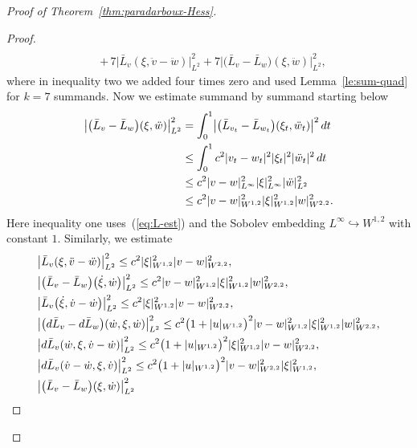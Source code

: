 \documentclass[10pt,a4paper]{amsart}
\def\abs#1{\mathopen|#1\mathclose|}
\newcommand{\INTO}{\hookrightarrow} %
\begin{document}
\begin{proof}[Proof of Theorem~\ref{thm:paradarboux-Hess}]
\begin{proof}
\begin{equation*}
\begin{split}
 \\
 &{+}\,7\bigl|\bar L_v(\xi,\ddot v-\ddot w)\bigr|_{L^2}^2
 +7\bigl|\bigl(\bar L_v-\bar L_w\bigr)(\xi,\ddot w)\bigr|_{L^2}^2,
\end{split}
\end{equation*}
where in inequality two we added four times zero
and used Lemma~\ref{le:sum-quad} for $k=7$ summands.
Now we estimate summand by summand starting below
\begin{equation*}
\begin{split}
 \bigl|\bigl(\bar L_v-\bar L_w\bigr)(\xi,\ddot w)\bigr|_{L^2}^2
 &=\int_0^1\bigl|\bigl(\bar L_{v_t}-\bar L_{w_t}\bigr) (\xi_t,\ddot w_t)\bigr|^2\, {\rm d}t
\\
 &\le \int_0^1c^2
 \abs{v_t-w_t}^2\abs{\xi_t}^2\abs{\ddot w_t}^2\, {\rm d}t
\\
 &\le c^2 \abs{v-w}_{L^\infty}^2\abs{\xi}_{L^\infty}^2
 \abs{\ddot w}_{L^2}^2
\\
 &\le c^2 \abs{v-w}_{W^{1,2}}^2\abs{\xi}_{W^{1,2}}^2
 \abs{w}_{W^{2,2}}^2 .
\end{split}
\end{equation*}
Here inequality one uses~(\ref{eq:L-est}) and the Sobolev embedding
$L^\infty\INTO W^{1,2}$ with constant $1$.
Similarly, we estimate
\begin{equation*}
\begin{split}
& \bigl|\bar L_v(\xi,\ddot v-\ddot w)\bigr|_{L^2}^2
\le c^2 \abs{\xi}_{W^{1,2}}^2\abs{v-w}_{W^{2,2}}^2,
\\
& \bigl|\bigl(\bar L_v-\bar L_w\bigr)\bigl(\dot \xi,\dot w\bigr)\bigr|_{L^2}^2
\le c^2 \abs{v-w}_{W^{1,2}}^2 \abs{\xi}_{W^{1,2}}^2 \abs{w}_{W^{2,2}}^2,
\\
& \bigl|\bar L_v\bigl(\dot \xi,\dot v-\dot w\bigr)\bigr|_{L^2}^2
\le c^2 \abs{\xi}_{W^{1,2}}^2 \abs{v-w}_{W^{2,2}}^2,
\\
& \bigl|\bigl({\rm d}\bar L_v-{\rm d}\bar L_w\bigr)(\dot w,\xi,\dot w)\bigr|_{L^2}^2
\le c^2 \bigl(1+\abs{u}_{W^{1,2}} \bigr)^2
 \abs{v-w}_{W^{1,2}}^2
 \abs{\xi}_{W^{1,2}}^2\abs{w}_{W^{2,2}}^2,
\\
& \bigl|{\rm d}\bar L_v(\dot w,\xi,\dot v-\dot w)\bigr|_{L^2}^2
\le c^2 \bigl(1+\abs{u}_{W^{1,2}} \bigr)^2 \abs{\xi}_{W^{1,2}}^2
 \abs{v-w}_{W^{2,2}}^2,
\\
& \bigl|{\rm d}\bar L_v(\dot v-\dot w,\xi,\dot v)\bigr|_{L^2}^2
\le c^2 \bigl(1+\abs{u}_{W^{1,2}} \bigr)^2
 \abs{v-w}_{W^{2,2}}^2\abs{\xi}_{W^{1,2}}^2,
\\
& \bigl|\bigl(\bar L_v-\bar L_w\bigr) (\xi,\dot w)\bigr|_{L^2}^2

\end{split}
\end{equation*}
\end{proof}
\end{proof}
\end{document}
